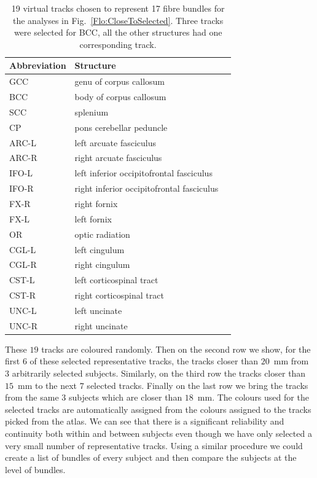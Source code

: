 \documentclass[preprint,authoryear,a4paper,10pt,onecolumn]{elsarticle}
\begin{document}
\begin{table}
\small\addtolength{\tabcolsep}{-5pt}
\begin{centering}
\begin{tabular}{lll}
\hline 
\hline
Abbreviation & Structure \tabularnewline
\hline
GCC   & genu of corpus callosum \tabularnewline
BCC   & body of corpus callosum \tabularnewline 
SCC   & splenium \tabularnewline
CP    & pons cerebellar peduncle \tabularnewline
ARC-L & left arcuate fasciculus \tabularnewline
ARC-R & right arcuate fasciculus \tabularnewline
IFO-L & left inferior occipitofrontal fasciculus \tabularnewline
IFO-R & right inferior occipitofrontal fasciculus \tabularnewline
FX-R  & right fornix \tabularnewline
FX-L  & left fornix  \tabularnewline
OR    & optic radiation  \tabularnewline
CGL-L & left cingulum  \tabularnewline
CGL-R & right cingulum  \tabularnewline
CST-L & left corticospinal tract  \tabularnewline
CST-R & right corticospinal tract \tabularnewline
UNC-L & left uncinate \tabularnewline
UNC-R & right uncinate \tabularnewline
\hline
\end{tabular}
\par\end{centering}
\caption{19 virtual tracks chosen to represent 17 fibre bundles for 
  the analyses in Fig.~\ref{Flo:CloseToSelected}. Three tracks were 
  selected for BCC, all the other structures had one corresponding 
  track.\label{Flo:structures}}
\end{table}

These $19$ tracks are coloured randomly. Then on the second row we show,
for the first $6$ of these selected representative tracks, the tracks
closer than $20$~mm from $3$ arbitrarily selected subjects. Similarly,
on the third row the tracks closer than $15$~mm to the next $7$ selected
tracks. Finally on the last row we bring the tracks from the same $3$
subjects which are closer than $18$~mm.  The colours used for the
selected tracks are automatically assigned from the colours assigned to
the tracks picked from the atlas. We can see that there is a significant
reliability and continuity both within and between subjects even though
we have only selected a very small number of representative
tracks. Using a similar procedure we could create a list of bundles of
every subject and then compare the subjects at the level of bundles.
\end{document}
